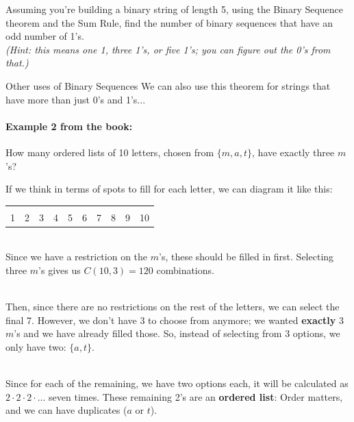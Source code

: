 {    \hrulefill
       
    \begin{questionNOGRADE}{\thequestion}
	    Assuming you're building a binary string of length 5,
	    using the Binary Sequence theorem and the Sum Rule, 
	    find the number of binary sequences that have an odd number of 1's.
	    \\ \textit{(Hint: this means one 1, three 1's, or five 1's; you can figure out the 0's from that.)}
	\end{questionNOGRADE}
	
	\newpage
	
	\begin{intro}{Other uses of Binary Sequences}
		We can also use this theorem for strings that have more than just 0's and 1's...
		
		\paragraph{Example 2 from the book:} How many ordered lists of 10 letters, chosen from $\{m, a, t\}$, 
		have exactly three $m$'s?
		
		If we think in terms of spots to fill for each letter, we can diagram it like this:
		
		\begin{center}
			\begin{tabular}{c c c c c c c c c c}
				\fitb[0.5cm] & \fitb[0.5cm] & \fitb[0.5cm] & \fitb[0.5cm] & \fitb[0.5cm] & \fitb[0.5cm] & \fitb[0.5cm] & \fitb[0.5cm] & \fitb[0.5cm] & \fitb[0.5cm]
				\\
				1 & 2 & 3 & 4 & 5 & 6 & 7 & 8 & 9 & 10
			\end{tabular}
		\end{center}
		
		~\\ Since we have a restriction on the $m$'s, these should be filled in first. Selecting three $m$'s gives us
		$C(10,3) = 120$ combinations.
		
		~\\ Then, since there are no restrictions on the rest of the letters, we can select the final 7.
		However, we don't have 3 to choose from anymore; we wanted \textbf{exactly} 3 $m$'s and we have
		already filled those. So, instead of selecting from 3 options, we only have two: $\{a, t\}$.
		
		~\\ Since for each of the remaining, we have two options each, it will be calculated as $2 \cdot 2 \cdot 2 \cdot ...$
		seven times. These remaining 2's are an \textbf{ordered list}: Order matters, and we can have duplicates ($a$ or $t$).
		

\end{intro}}
